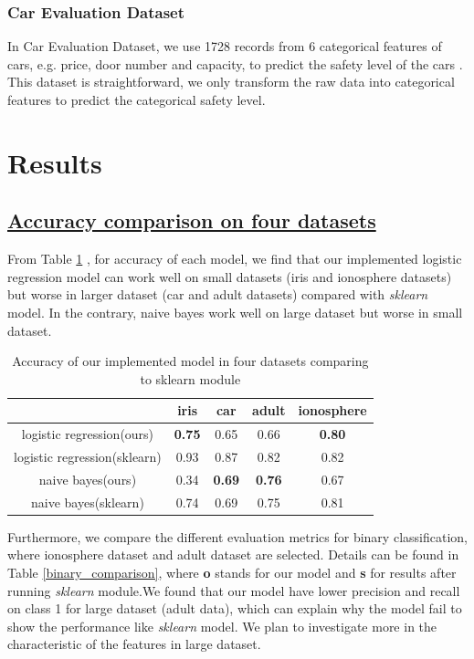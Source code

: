\documentclass[11pt]{scrartcl}
\begin{document}
\subsubsection*{Car Evaluation Dataset}
In Car Evaluation Dataset, we use 1728 records from 6 categorical features of cars, e.g. price, door number and capacity, to predict the safety level of the cars \cite{bohanec1988knowledge}. This dataset is straightforward, we only transform the raw data into categorical features to predict the categorical safety level.


\section{Results}
\subsection*{\underline{Accuracy comparison on four datasets}}

From Table \ref{accuracy_fourdata} , for accuracy of each model, we find that our implemented logistic regression model can work well on small datasets (iris and ionosphere datasets) but worse in larger dataset (car and adult datasets) compared with \textit{sklearn} model. In the contrary, naive bayes work well on large dataset but worse in small dataset.

\begin{table}[H]
	\centering
	\begin{tabular}{c|cccc}
		\hline
		 & iris	 & car & adult & ionosphere \\
		\hline
		logistic regression(ours) &  \textbf{0.75} & 0.65 & 0.66 & \textbf{0.80}\\
		logistic regression(sklearn) & 0.93 & 0.87 & 0.82 & 0.82\\
		naive bayes(ours) & 0.34 &  \textbf{0.69} & \textbf{0.76} & 0.67 \\
		naive bayes(sklearn) & 0.74 & 0.69 & 0.75 & 0.81 \\
		\hline
	\end{tabular} 
	\caption{Accuracy of our implemented model in four datasets comparing to sklearn module}
	\label{accuracy_fourdata}
\end{table}

Furthermore, we compare the different evaluation metrics for binary classification, where ionosphere dataset and adult dataset are selected. Details can be found in Table \ref{binary_comparison}, where \textbf{o} stands for our model and \textbf{s} for results after running \textit{sklearn} module.We found that our model have lower precision and recall on class 1 for large dataset (adult data), which can explain why the model fail to show the performance like \textit{sklearn} model. We plan to investigate more in the characteristic of the features in large dataset.
\end{document}
